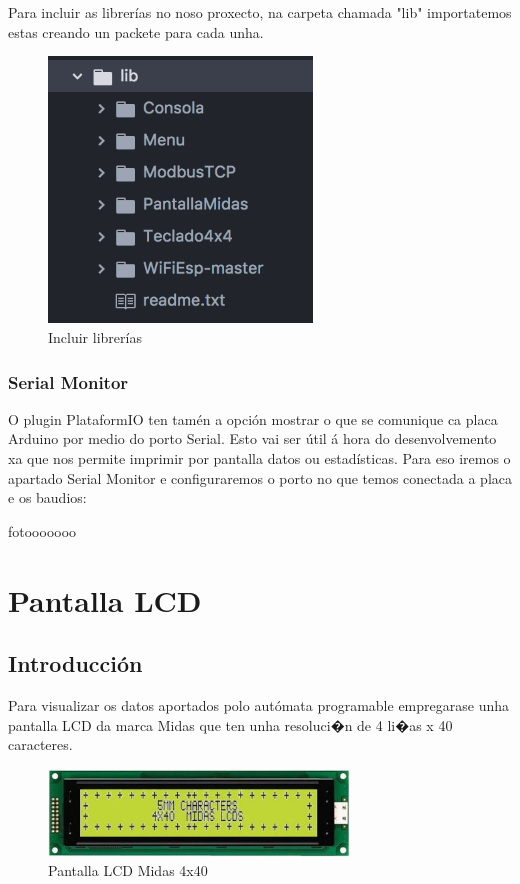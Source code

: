 \documentclass[11pt,twoside]{book}
\begin{document}
Para incluir as librerías no noso proxecto, na carpeta chamada "lib" importatemos estas creando un packete para cada unha.

\begin{figure}[H]
	\begin{center}
		\includegraphics[width=7cm]{images/librerias.png}
	\end{center}
	\caption{Incluir librerías}
	\label{fig:LibreriasAtom}
\end{figure}

\subsection{Serial Monitor}

O plugin PlataformIO ten tamén a opción mostrar o que se comunique ca placa Arduino por medio do porto Serial.
Esto vai ser útil á hora do desenvolvemento xa que nos permite imprimir por pantalla datos ou estadísticas.
 Para eso iremos o apartado Serial Monitor e configuraremos o porto no que temos conectada a placa e os baudios:
 
 fotooooooo
 
 

\chapter{Pantalla LCD}

\section{Introducción}

Para visualizar os datos aportados polo autómata programable empregarase unha pantalla LCD da marca Midas que ten unha resoluci�n de 4 li�as x 40 caracteres. 

\begin{figure}[H]
	\begin{center}
		\includegraphics[width=8cm]{images/lcd.jpg}
	\end{center}
	\caption{Pantalla LCD Midas 4x40}
	\label{fig:PantallaLCD}
\end{figure}
\end{document}
